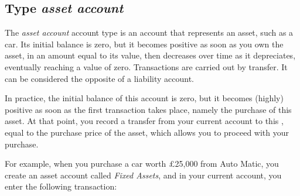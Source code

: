 \subsection{Type \emph{asset account}\label{accounts-type-assets}}

The \emph{asset account} account type is an account that represents an asset, such as a car. Its initial balance is zero, but it becomes positive as soon as you own the asset, in an amount equal to its value, then decreases over time as it depreciates, eventually reaching a value of zero. Transactions are carried out by transfer. It can be considered the opposite of a liability account.

In practice, the initial balance of this account is zero, but it becomes (highly) positive as soon as the first transaction takes place, namely the purchase of this asset. At that point, you record a transfer from your current account to this , equal to the purchase price of the asset, which allows you to proceed with your purchase.

For example, when you purchase a car worth £25,000 from Auto Matic, you create an asset account called \emph{Fixed Assets}, and in your current account, you enter the following transaction:

\noindent

